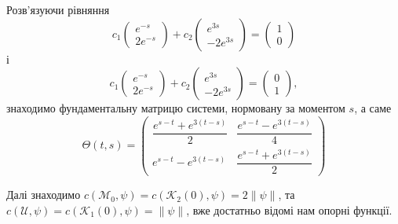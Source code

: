 \begin{solution}
    Розв'язуючи рівняння
    \[ c_1 \begin{pmatrix} e^{-s} \\ 2e^{-s} \end{pmatrix} + c_2 \begin{pmatrix} e^{3s} \\ -2e^{3s} \end{pmatrix} = \begin{pmatrix} 1 \\ 0 \end{pmatrix} \]
    і
    \[ c_1 \begin{pmatrix} e^{-s} \\ 2e^{-s} \end{pmatrix} + c_2 \begin{pmatrix} e^{3s} \\ -2e^{3s} \end{pmatrix} = \begin{pmatrix} 0 \\ 1 \end{pmatrix}, \]
    знаходимо фундаментальну матрицю системи, нормовану за моментом $s$, а саме 
    \[ \Theta(t,s) = \begin{pmatrix} \dfrac{e^{s-t} + e^{3(t-s)}}{2} & \dfrac{e^{s-t} - e^{3(t-s)}}{4} \\ e^{s-t} - e^{3(t-s)} & \dfrac{e^{s-t} + e^{3(t-s)}}{2} \end{pmatrix} \]
    
    
    Далі знаходимо $c(\mathcal{M}_0, \psi) = c(\mathcal{K}_2(0), \psi) = 2\|\psi\|$, та $c(\mathcal{U}, \psi) = c(\mathcal{K}_1(0), \psi) = \|\psi\|$, вже достатньо відомі нам опорні функції. \\
    

\end{solution}
